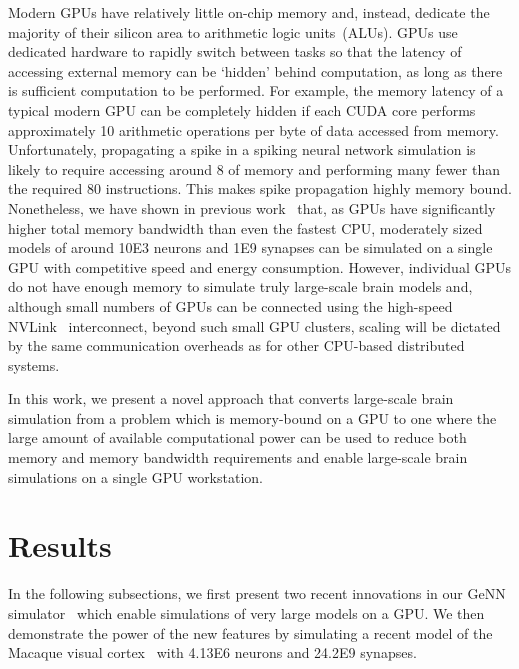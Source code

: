 \documentclass[9pt,twocolumn,twoside,lineno]{pnas-new}
\begin{document}
Modern GPUs have relatively little on-chip memory and, instead, dedicate the majority of their silicon area to arithmetic logic units~(ALUs).
GPUs use dedicated hardware to rapidly switch between tasks so that the latency of accessing external memory can be `hidden' behind computation, as long as there is sufficient computation to be performed.
For example, the memory latency of a typical modern GPU can be completely hidden if each CUDA core performs approximately 10 arithmetic operations per byte of data accessed from memory.
Unfortunately, propagating a spike in a spiking neural network simulation is likely to require accessing around \SI{8}{\byte} of memory and performing many fewer than the required 80 instructions. 
This makes spike propagation highly memory bound.
Nonetheless, we have shown in previous work~\citep{Knight2018} that, as GPUs have significantly higher total memory bandwidth than even the fastest CPU, moderately sized models of around \num{10E3} neurons and \num{1E9} synapses can be simulated on a single GPU with competitive speed and energy consumption.
However, individual GPUs do not have enough memory to simulate truly large-scale brain models and, although small numbers of GPUs can be connected using the high-speed NVLink~\citep{NVIDIACorporation} interconnect, beyond such small GPU clusters, scaling will be dictated by the same communication overheads as for other CPU-based distributed systems.

In this work, we present a novel approach that converts large-scale brain simulation from a problem which is memory-bound on a GPU to one where the large amount of available computational power  can be used to reduce both memory and memory bandwidth requirements and enable large-scale brain simulations on a single GPU workstation.

\section*{Results}
In the following subsections, we first present two recent innovations in our GeNN simulator~\citep{Yavuz2016} which enable simulations of very large models on a GPU.
We then demonstrate the power of the new features by simulating a recent model of the Macaque visual cortex~\citep{Schmidt2018} with \num{4.13E6} neurons and \num{24.2E9} synapses.
\end{document}
